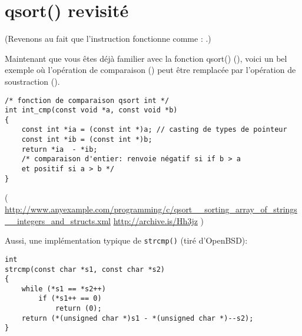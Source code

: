 \section{qsort() revisité}

(Revenons au fait que l'instruction  fonctionne comme : .)

Maintenant que vous êtes déjà familier avec la fonction qsort() (),
voici un bel exemple où l'opération de comparaison () peut être remplacée
par l'opération de soustraction ().

\begin{lstlisting}[style=customc]
/* fonction de comparaison qsort int */ 
int int_cmp(const void *a, const void *b) 
{ 
    const int *ia = (const int *)a; // casting de types de pointeur
    const int *ib = (const int *)b;
    return *ia  - *ib; 
	/* comparaison d'entier: renvoie négatif si if b > a 
	et positif si a > b */ 
} 
\end{lstlisting}

( \url{http://www.anyexample.com/programming/c/qsort__sorting_array_of_strings__integers_and_structs.xml} \url{http://archive.is/Hh3jz} )

Aussi, une implémentation typique de \verb|strcmp()| (tiré d'OpenBSD):

\begin{lstlisting}[style=customc]
int
strcmp(const char *s1, const char *s2)
{
	while (*s1 == *s2++)
		if (*s1++ == 0)
			return (0);
	return (*(unsigned char *)s1 - *(unsigned char *)--s2);
}
\end{lstlisting}
